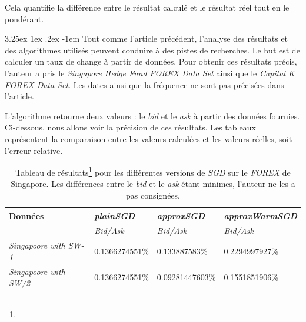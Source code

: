 \documentclass[a4paper, 11pt]{article}
\makeatletter
\newcounter{subsubsubsection}[subsubsection]
\renewcommand\paragraph{\@startsection{paragraph}{5}{\z@}%
  {3.25ex \@plus1ex \@minus.2ex}%
  {-1em}%
  {\normalfont\normalsize\bfseries}}
\makeatother
\begin{document}
Cela quantifie la différence entre le résultat calculé et le résultat réel tout en le pondérant.

\paragraph{}
Tout comme l'article précédent, l'analyse des résultats et des algorithmes utilisés peuvent conduire à des pistes de recherches.
Le but est de calculer un taux de change à partir de données. Pour obtenir ces résultats précis, l'auteur a pris le
\textit{Singapore Hedge Fund FOREX Data Set} ainsi que le \textit{Capital K FOREX Data Set}. Les dates ainsi que la fréquence
ne sont pas précisées dans l'article.

L'algorithme retourne deux valeurs : le \textit{bid} et le \textit{ask} à partir des données fournies. Ci-dessous, nous allons
voir la précision de ces résultats. Les tableaux représentent la
comparaison entre les valeurs calculées et les valeurs réelles, soit l'erreur relative.

\begin{table}[H]
	\centering
\begin{tabular}{|l|l|l|l|}
	\hline
	Données & \textit{plainSGD} & \textit{approxSGD} & \textit{approxWarmSGD}\\
	\hline
	\ & \textit{Bid/Ask} & \textit{Bid/Ask} & \textit{Bid/Ask} \\
	\hline
	\textit{Singapoore with SW-1\footnotemark{}} & 0.1366274551\% & 0.133887583\% & 0.2294997927\% \\
	\hline
	\textit{Singapoore with SW/2\footnotemark{}} & 0.1366274551\% & 0.09281447603\% & 0.1551851906\%\\
	\hline

\end{tabular}
\caption[]{Tableau de résultats\footnote[3]{} pour les différentes versions de \textit{SGD} sur le
\textit{FOREX} de Singapore. Les différences entre le \textit{bid} et le \textit{ask} étant minimes,
l'auteur ne les a pas consignées.}
\end{table}

 \addtocounter{footnote}{-2} %
\end{document}
